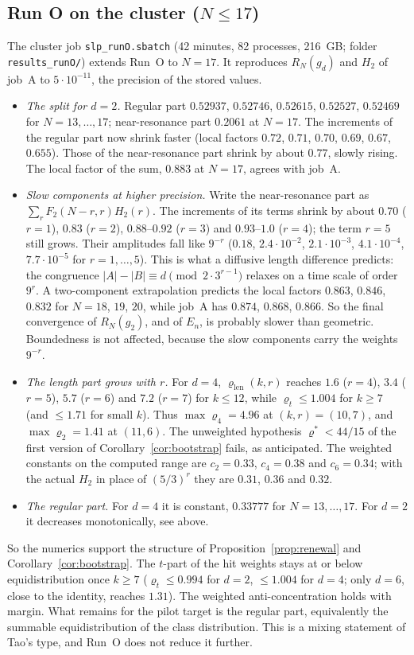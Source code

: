 \documentclass[11pt]{article}
\theoremstyle{remark}
\begin{document}
\subsection*{Run O on the cluster ($N\le17$)}
The cluster job \texttt{slp\_runO.sbatch} (42 minutes, 82 processes, 216~GB; folder \texttt{results\_runO/}) extends Run~O to $N=17$. It reproduces $R_N(g_d)$ and $H_2$ of job~A to $5\cdot10^{-11}$, the precision of the stored values.
\begin{itemize}
\item \emph{The split for $d=2$.} Regular part $0.52937$, $0.52746$, $0.52615$, $0.52527$, $0.52469$ for $N=13,\dots,17$; near-resonance part $0.2061$ at $N=17$. The increments of the regular part now shrink faster (local factors $0.72$, $0.71$, $0.70$, $0.69$, $0.67$, $0.655$). Those of the near-resonance part shrink by about $0.77$, slowly rising. The local factor of the sum, $0.883$ at $N=17$, agrees with job~A.
\item \emph{Slow components at higher precision.} Write the near-resonance part as $\sum_rF_2(N-r,r)H_2(r)$. The increments of its terms shrink by about $0.70$ ($r=1$), $0.83$ ($r=2$), $0.88$--$0.92$ ($r=3$) and $0.93$--$1.0$ ($r=4$); the term $r=5$ still grows. Their amplitudes fall like $9^{-r}$ ($0.18$, $2.4\cdot10^{-2}$, $2.1\cdot10^{-3}$, $4.1\cdot10^{-4}$, $7.7\cdot10^{-5}$ for $r=1,\dots,5$). This is what a diffusive length difference predicts: the congruence $|A|-|B|\equiv d\pmod{2\cdot3^{r-1}}$ relaxes on a time scale of order $9^r$. A two-component extrapolation predicts the local factors $0.863$, $0.846$, $0.832$ for $N=18$, $19$, $20$, while job~A has $0.874$, $0.868$, $0.866$. So the final convergence of $R_N(g_2)$, and of $E_n$, is probably slower than geometric. Boundedness is not affected, because the slow components carry the weights $9^{-r}$.
\item \emph{The length part grows with $r$.} For $d=4$, $\varrho_{\mathrm{len}}(k,r)$ reaches $1.6$ ($r=4$), $3.4$ ($r=5$), $5.7$ ($r=6$) and $7.2$ ($r=7$) for $k\le12$, while $\varrho_t\le1.004$ for $k\ge7$ (and $\le1.71$ for small $k$). Thus $\max\varrho_4=4.96$ at $(k,r)=(10,7)$, and $\max\varrho_2=1.41$ at $(11,6)$. The unweighted hypothesis $\varrho^*<44/15$ of the first version of Corollary~\ref{cor:bootstrap} fails, as anticipated. The weighted constants on the computed range are $c_2=0.33$, $c_4=0.38$ and $c_6=0.34$; with the actual $H_2$ in place of $(5/3)^r$ they are $0.31$, $0.36$ and $0.32$.
\item \emph{The regular part.} For $d=4$ it is constant, $0.33777$ for $N=13,\dots,17$. For $d=2$ it decreases monotonically, see above.
\end{itemize}
So the numerics support the structure of Proposition~\ref{prop:renewal} and Corollary~\ref{cor:bootstrap}. The $t$-part of the hit weights stays at or below equidistribution once $k\ge7$ ($\varrho_t\le0.994$ for $d=2$, $\le1.004$ for $d=4$; only $d=6$, close to the identity, reaches $1.31$). The weighted anti-concentration holds with margin. What remains for the pilot target is the regular part, equivalently the summable equidistribution of the class distribution. This is a mixing statement of Tao's type, and Run~O does not reduce it further.
\end{document}
